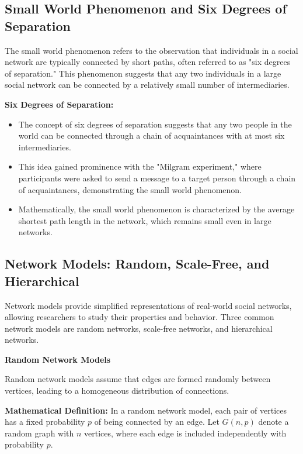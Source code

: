 \documentclass[12pt]{book} %
\begin{document}
\subsection{Small World Phenomenon and Six Degrees of Separation}

The small world phenomenon refers to the observation that individuals in a social network are typically connected by short paths, often referred to as "six degrees of separation." This phenomenon suggests that any two individuals in a large social network can be connected by a relatively small number of intermediaries.

\textbf{Six Degrees of Separation:}
\begin{itemize}
    \item The concept of six degrees of separation suggests that any two people in the world can be connected through a chain of acquaintances with at most six intermediaries.
    \item This idea gained prominence with the "Milgram experiment," where participants were asked to send a message to a target person through a chain of acquaintances, demonstrating the small world phenomenon.
    \item Mathematically, the small world phenomenon is characterized by the average shortest path length in the network, which remains small even in large networks.
\end{itemize}

\subsection{Network Models: Random, Scale-Free, and Hierarchical}

Network models provide simplified representations of real-world social networks, allowing researchers to study their properties and behavior. Three common network models are random networks, scale-free networks, and hierarchical networks.

\textbf{Random Network Models}

Random network models assume that edges are formed randomly between vertices, leading to a homogeneous distribution of connections.

\textbf{Mathematical Definition:} In a random network model, each pair of vertices has a fixed probability \( p \) of being connected by an edge. Let \( G(n, p) \) denote a random graph with \( n \) vertices, where each edge is included independently with probability \( p \).
\end{document}
